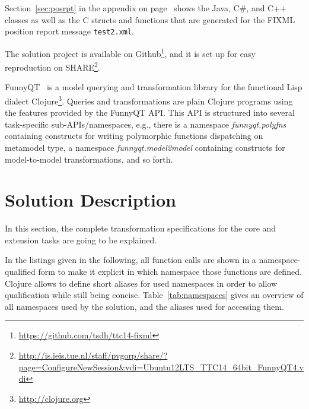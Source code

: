 \documentclass[submission]{eptcs}
\begin{document}
Section~\ref{sec:posrpt} in the appendix on page~\pageref{sec:posrpt} shows the
Java, C\#, and C++ classes as well as the C structs and functions that are
generated for the FIXML position report message \texttt{test2.xml}.

The solution project is available on
Github\footnote{\url{https://github.com/tsdh/ttc14-fixml}}, and it is set up
for easy reproduction on
SHARE\footnote{\url{http://is.ieis.tue.nl/staff/pvgorp/share/?page=ConfigureNewSession&vdi=Ubuntu12LTS_TTC14_64bit_FunnyQT4.vdi}}.

FunnyQT~\cite{Horn2013MQWFQ} is a model querying and transformation library for
the functional Lisp dialect Clojure\footnote{\url{http://clojure.org}}.
Queries and transformations are plain Clojure programs using the features
provided by the FunnyQT API.  This API is structured into several task-specific
sub-APIs/namespaces, e.g., there is a namespace \emph{funnyqt.polyfns}
containing constructs for writing polymorphic functions dispatching on
metamodel type, a namespace \emph{funnyqt.model2model} containing constructs
for model-to-model transformations, and so forth.


\section{Solution Description}
\label{sec:solution-description}

In this section, the complete transformation specifications for the core and
extension tasks are going to be explained.


In the listings given in the following, all function calls are shown in a
namespace-qualified form to make it explicit in which namespace those functions
are defined.  Clojure allows to define short aliases for used namespaces in
order to allow qualification while still being concise.
Table~\ref{tab:namespaces} gives an overview of all namespaces used by the
solution, and the aliases used for accessing them.
\end{document}
